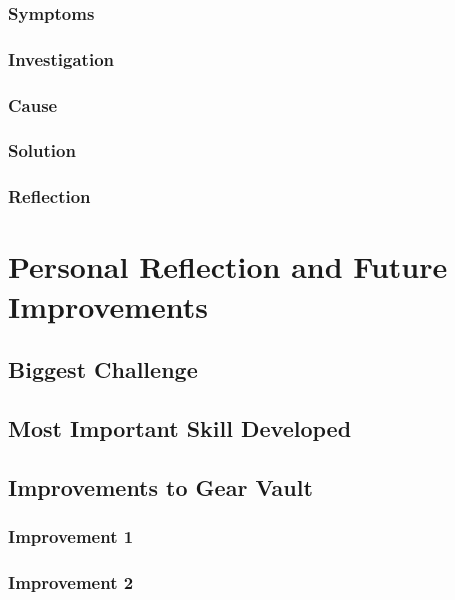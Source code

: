 \documentclass{article}[12pt]
\begin{document}
    \subsubsection{Symptoms}
    
    \subsubsection{Investigation}

    \subsubsection{Cause}

    \subsubsection{Solution}

    \subsubsection{Reflection}

    \section{Personal Reflection and Future Improvements}
    \subsection{Biggest Challenge}
    
    \subsection{Most Important Skill Developed}

    \subsection{Improvements to Gear Vault}
    \subsubsection{Improvement 1}
    
    \subsubsection{Improvement 2}
\end{document}
